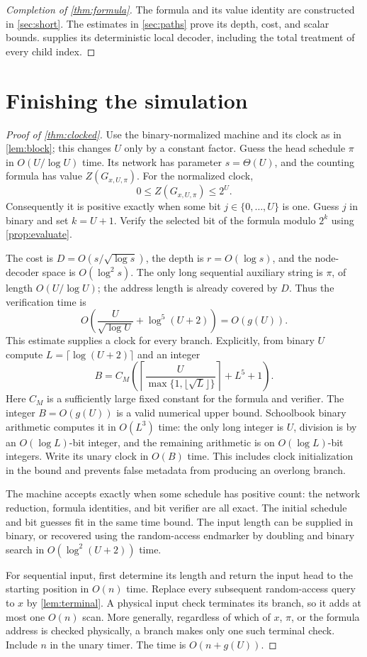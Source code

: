\documentclass[11pt]{article}
\theoremstyle{definition}
\theoremstyle{remark}
\begin{document}
\begin{proof}[Completion of \cref{thm:formula}]
The formula and its value identity are constructed in \cref{sec:short}. The estimates in \cref{sec:paths} prove its depth, cost, and scalar bounds.  supplies its deterministic local decoder, including the total treatment of every child index.
\end{proof}

\section{Finishing the simulation}\label{sec:finish}

\begin{proof}[Proof of \cref{thm:clocked}]
Use the binary-normalized machine and its clock as in \cref{lem:block}; this changes $U$ only by a constant factor. Guess the head schedule $\pi$ in $O(U/\log U)$ time. Its network has parameter $s=\Theta(U)$, and the counting formula has value $Z(G_{x,U,\pi})$. For the normalized clock,
\[
 0\le Z(G_{x,U,\pi})\le2^U.
\]
Consequently it is positive exactly when some bit $j\in\{0,\ldots,U\}$ is one. Guess $j$ in binary and set $k=U+1$. Verify the selected bit of the formula modulo $2^k$ using \cref{prop:evaluate}.

The cost is $D=O(s/\sqrt{\log s})$, the depth is $r=O(\log s)$, and the node-decoder space is $O(\log^2s)$. The only long sequential auxiliary string is $\pi$, of length $O(U/\log U)$; the address length is already covered by $D$. Thus the verification time is
\[
 O\left(\frac{U}{\sqrt{\log U}}+\log^5(U+2)\right)=O(g(U)).
\]
This estimate supplies a clock for every branch. Explicitly, from binary $U$ compute $L=\lceil\log(U+2)\rceil$ and an integer
\[
 B=C_M\left(\left\lceil\frac{U}{\max\{1,\lfloor\sqrt L\rfloor\}}\right\rceil+L^5+1\right).
\]
Here $C_M$ is a sufficiently large fixed constant for the formula and verifier. The integer $B=O(g(U))$ is a valid numerical upper bound. Schoolbook binary arithmetic computes it in $O(L^3)$ time: the only long integer is $U$, division is by an $O(\log L)$-bit integer, and the remaining arithmetic is on $O(\log L)$-bit integers. Write its unary clock in $O(B)$ time. This includes clock initialization in the bound and prevents false metadata from producing an overlong branch.

The machine accepts exactly when some schedule has positive count: the network reduction, formula identities, and bit verifier are all exact. The initial schedule and bit guesses fit in the same time bound. The input length can be supplied in binary, or recovered using the random-access endmarker by doubling and binary search in $O(\log^2(U+2))$ time.

For sequential input, first determine its length and return the input head to the starting position in $O(n)$ time. Replace every subsequent random-access query to $x$ by \cref{lem:terminal}. A physical input check terminates its branch, so it adds at most one $O(n)$ scan. More generally, regardless of which of $x$, $\pi$, or the formula address is checked physically, a branch makes only one such terminal check. Include $n$ in the unary timer. The time is $O(n+g(U))$.
\end{proof}
\end{document}
